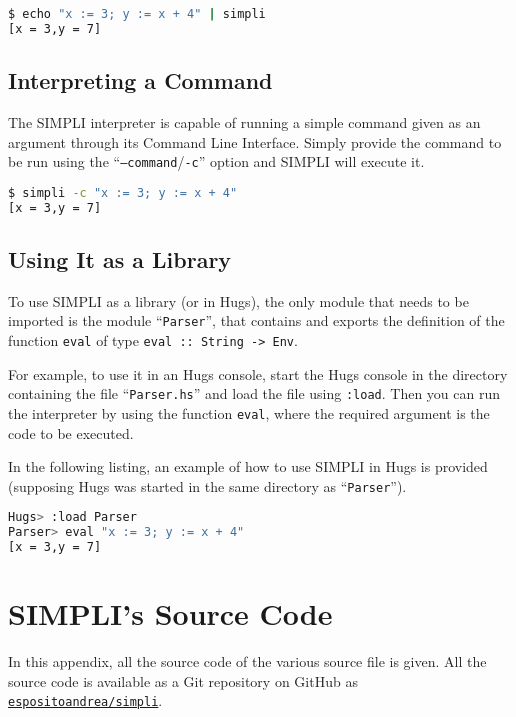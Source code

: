 \documentclass{esposito-documentation}
\begin{document}
\begin{lstlisting}[language=sh,numbers=none]
$ echo "x := 3; y := x + 4" | simpli
[x = 3,y = 7]
\end{lstlisting}

\section{Interpreting a Command}

The SIMPLI interpreter is capable of running a simple command given as an
argument through its Command Line Interface. Simply provide the command to be
run using the ``\texttt{--command}/\texttt{-c}'' option and SIMPLI will execute
it.

\begin{lstlisting}[language=sh,numbers=none]
$ simpli -c "x := 3; y := x + 4"
[x = 3,y = 7]
\end{lstlisting}

\section{Using It as a Library}

To use SIMPLI as a library (or in Hugs), the only module that needs to be
imported is the module ``\texttt{Parser}'', that contains and exports the
definition of the function \texttt{eval} of type
\lstinline|eval :: String -> Env|.

For example, to use it in an Hugs console, start the Hugs console in the
directory containing the file ``\texttt{Parser.hs}'' and load the file using
\texttt{:load}. Then you can run the interpreter by using the function
\texttt{eval}, where the required argument is the code to be executed.

In the following listing, an example of how to use SIMPLI in Hugs is provided
(supposing Hugs was started in the same directory as ``\texttt{Parser}'').

\begin{lstlisting}[language=sh,numbers=none]
Hugs> :load Parser
Parser> eval "x := 3; y := x + 4"
[x = 3,y = 7]
\end{lstlisting}

\appendix
\chapter{SIMPLI's Source Code}\label{app:source}

In this appendix, all the source code of the various source file is given. All
the source code is available as a Git repository on GitHub as
\href{https://github.com/espositoandrea/simpli}{\texttt{espositoandrea/simpli}}.
\end{document}
